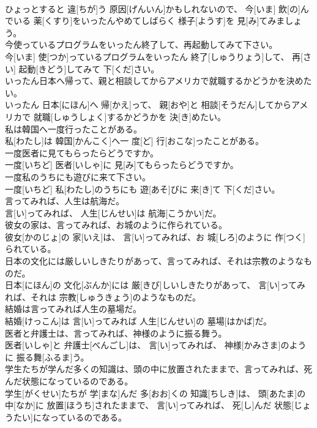 \documentclass[8pt]{extreport}
\begin{document}
\begin{CJK}{UTF8}{min}
\\	ひょっとすると 違[ちが]う 原因[げんいん]かもしれないので、 今[いま] 飲[の]んでいる 薬[くすり]をいったんやめてしばらく 様子[ようす]を 見[み]てみましょう。
\\	今使っているプログラムをいったん終了して、再起動してみて下さい。	
\\	今[いま] 使[つか]っているプログラムをいったん 終了[しゅうりょう]して、 再[さい] 起動[きどう]してみて 下[くだ]さい。
\\	いったん日本へ帰って、親と相談してからアメリカで就職するかどうかを決めたい。	
\\	いったん 日本[にほん]へ 帰[かえ]って、 親[おや]と 相談[そうだん]してからアメリカで 就職[しゅうしょく]するかどうかを 決[き]めたい。
\\	私は韓国へ一度行ったことがある。	
\\	私[わたし]は 韓国[かんこく]へ一 度[ど] 行[おこな]ったことがある。
\\	一度医者に見てもらったらどうですか。	
\\	一度[いちど] 医者[いしゃ]に 見[み]てもらったらどうですか。
\\	一度私のうちにも遊びに来て下さい。	
\\	一度[いちど] 私[わたし]のうちにも 遊[あそ]びに 来[き]て 下[くだ]さい。
\\	言ってみれば、人生は航海だ。	
\\	言[い]ってみれば、 人生[じんせい]は 航海[こうかい]だ。
\\	彼女の家は、言ってみれば、お城のように作られている。	
\\	彼女[かのじょ]の 家[いえ]は、 言[い]ってみれば、お 城[しろ]のように 作[つく]られている。
\\	日本の文化には厳しいしきたりがあって、言ってみれば、それは宗教のようなものだ。	
\\	日本[にほん]の 文化[ぶんか]には 厳[きび]しいしきたりがあって、 言[い]ってみれば、それは 宗教[しゅうきょう]のようなものだ。
\\	結婚は言ってみれば人生の墓場だ。	
\\	結婚[けっこん]は 言[い]ってみれば 人生[じんせい]の 墓場[はかば]だ。
\\	医者と弁護士は、言ってみれば、神様のように振る舞う。	
\\	医者[いしゃ]と 弁護士[べんごし]は、 言[い]ってみれば、 神様[かみさま]のように 振る舞[ふるま]う。
\\	学生たちが学んだ多くの知識は、頭の中に放置されたままで、言ってみれば、死んだ状態になっているのである。	
\\	学生[がくせい]たちが 学[まな]んだ 多[おお]くの 知識[ちしき]は、 頭[あたま]の 中[なか]に 放置[ほうち]されたままで、 言[い]ってみれば、 死[し]んだ 状態[じょうたい]になっているのである。

\end{CJK}
\end{document}
